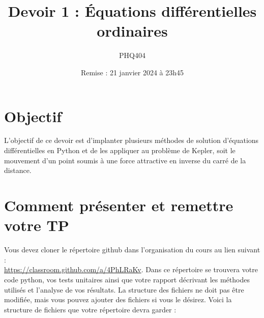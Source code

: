 \documentclass[12pt, letterpaper]{article}
\begin{document}
\title{Devoir 1 : Équations différentielles ordinaires}
\author{PHQ404}
\date{Remise : 21 janvier 2024 à 23h45}
\maketitle

\section{Objectif}\label{sec:objectif}

\noindent L'objectif de ce devoir est d'implanter plusieurs méthodes de solution
d'équations différentielles en Python 
et de les appliquer au problème de Kepler,
soit le mouvement d'un point soumis à une force attractive 
en inverse du carré de la distance.


\section{Comment présenter et remettre votre TP}\label{sec:comment-presenter-et-remettre-votre-tp}

\noindent Vous devez cloner le répertoire github dans l'organisation du cours au lien suivant :\\
\href{https://classroom.github.com/a/4PhLRaKv}{https://classroom.github.com/a/4PhLRaKv}.
Dans ce répertoire se trouvera votre code python, vos tests unitaires ainsi que votre rapport
décrivant les méthodes utilisés et l'analyse de vos résultats.
La structure des fichiers ne doit pas être modifiée, mais vous pouvez ajouter des fichiers si vous le désirez.
Voici la structure de fichiers que votre répertoire devra garder :

\bigskip
\end{document}
